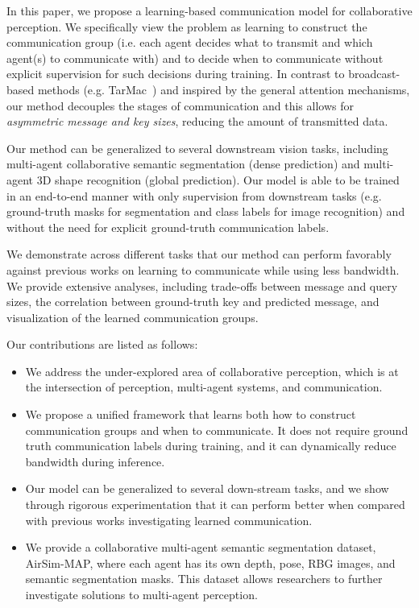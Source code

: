 In this paper, we propose a learning-based communication model for collaborative perception.
We specifically view the problem as learning to construct the communication group (i.e. each agent decides what to transmit and which agent(s) to communicate with) and to decide when to communicate without explicit supervision for such decisions during training. 
In contrast to broadcast-based methods (e.g. TarMac~\cite{das2019tarmac}) and inspired by the general attention mechanisms, our method decouples the stages of communication and this allows for \textit{asymmetric message and key sizes}, reducing the amount of transmitted data.

Our method can be generalized to several downstream vision tasks, including multi-agent collaborative semantic segmentation (dense prediction) and multi-agent 3D shape recognition (global prediction). 
Our model is able to be trained in an end-to-end manner with only supervision from downstream tasks (e.g. ground-truth masks for segmentation and class labels for image recognition) and without the need for explicit ground-truth communication labels. 

We demonstrate across different tasks that our method can perform favorably against previous works on learning to communicate while using less bandwidth. 
We provide extensive analyses, including trade-offs between message and query sizes, the correlation between ground-truth key and predicted message, and visualization of the learned communication groups.

Our contributions are listed as follows:
\begin{itemize}[topsep=0pt,itemsep=-1ex,partopsep=1ex,parsep=1ex,labelindent=0.0em,labelsep=0.2cm,leftmargin=*]
\item We address the under-explored area of collaborative perception, which is at the intersection of perception, multi-agent systems, and communication.
\item We propose a unified framework that learns both how to construct communication groups and when to communicate. It does not require ground truth communication labels during training, and it can dynamically reduce bandwidth during inference.
\item Our model can be generalized to several down-stream tasks, and we show through rigorous experimentation that it can perform better when compared with previous works investigating learned communication.
\item  We provide a collaborative multi-agent semantic segmentation dataset, AirSim-MAP, where each agent has its own depth, pose, RBG images, and semantic segmentation masks. This dataset allows researchers to further investigate solutions to multi-agent perception. 
\end{itemize}